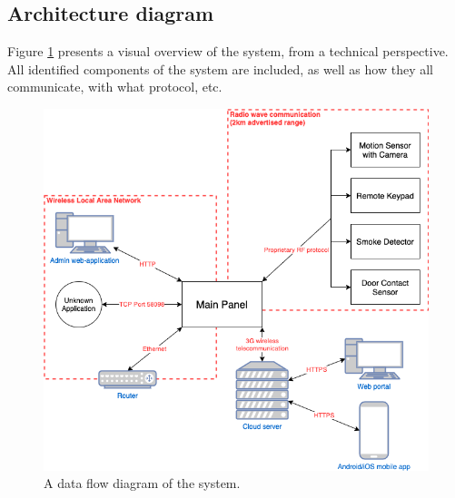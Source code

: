 \subsection{Architecture diagram}
Figure \ref{fig:system-overview} presents a visual overview of the system, from a technical perspective. All identified components of the system are included, as well as how they all communicate, with what protocol, etc.
\begin{figure}[!p]
    \centering
    \includegraphics[width=\textwidth]{images/5-threat-model/system-overview.png}
    \caption{A data flow diagram of the system.}
    \label{fig:system-overview}
\end{figure}


